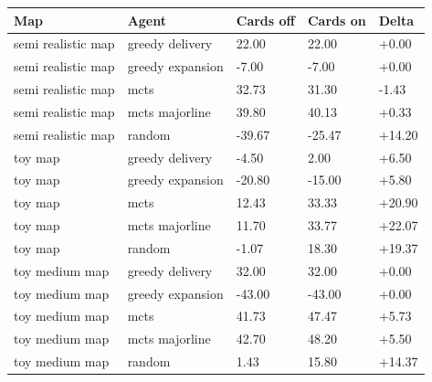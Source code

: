 \begin{tabular}{lllll}
\hline
Map & Agent & Cards off & Cards on & Delta \\
\hline
semi realistic map & greedy delivery & 22.00 & 22.00 & +0.00 \\
semi realistic map & greedy expansion & -7.00 & -7.00 & +0.00 \\
semi realistic map & mcts & 32.73 & 31.30 & -1.43 \\
semi realistic map & mcts majorline & 39.80 & 40.13 & +0.33 \\
semi realistic map & random & -39.67 & -25.47 & +14.20 \\
toy map & greedy delivery & -4.50 & 2.00 & +6.50 \\
toy map & greedy expansion & -20.80 & -15.00 & +5.80 \\
toy map & mcts & 12.43 & 33.33 & +20.90 \\
toy map & mcts majorline & 11.70 & 33.77 & +22.07 \\
toy map & random & -1.07 & 18.30 & +19.37 \\
toy medium map & greedy delivery & 32.00 & 32.00 & +0.00 \\
toy medium map & greedy expansion & -43.00 & -43.00 & +0.00 \\
toy medium map & mcts & 41.73 & 47.47 & +5.73 \\
toy medium map & mcts majorline & 42.70 & 48.20 & +5.50 \\
toy medium map & random & 1.43 & 15.80 & +14.37 \\
\hline
\end{tabular}
